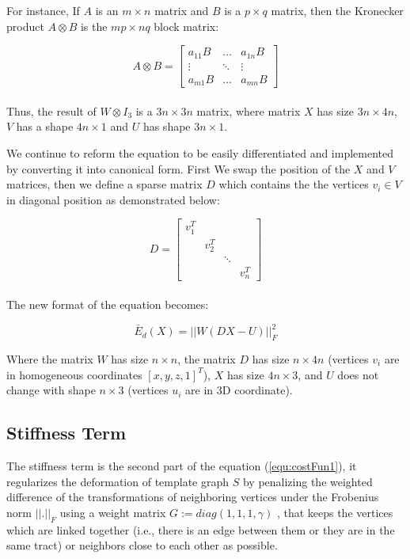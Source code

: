 \documentclass[../structure.tex]{subfiles}
\begin{document}
For instance, If $A$ is an $m \times n$ matrix and $B$ is a $p \times q$ matrix, then the Kronecker product $A \otimes B$ is the $mp \times nq$ block matrix:

\begin{equation*}
A \otimes B =
\begin{bmatrix}
a_{11}B & \dots  & a_{1n}B \\
\vdots  & \ddots & \vdots  \\
a_{m1}B & \dots  & a_{mn}B
\end{bmatrix}
\end{equation*}\\

Thus, the result of $W \otimes I_{3}$ is a $3n\times 3n$ matrix, where matrix $X$ has size $3n\times4n$, $V$ has a shape $4n\times1$ and $U$ has shape $3n\times1$.

We continue to reform the equation to be easily differentiated and implemented by converting it into canonical form. First We swap the position of the $X$ and $V$ matrices, then we define a sparse matrix $D$ which contains the the vertices $v_{i} \in V$ in diagonal position as demonstrated below:

\begin{equation}
D =
\begin{bmatrix}
v_{1}^T & & & \\
& v_{2}^T & & \\
& & \ddots & \\
& & & v_{n}^T
\end{bmatrix}
\label{equ:matD}
\end{equation}\\

The new format of the equation becomes:

\begin{equation}
\bar{E}_{d}(X) = ||W(DX-U)||_{F}^2
\label{equ:distance4}
\end{equation}

\hspace{2em}Where the matrix $W$ has size $n\times n$, the matrix $D$ has size $n\times 4n$ (vertices $v_{i}$ are in homogeneous coordinates $[x,y,z,1]^T$), $X$ has size $4n\times 3$, and $U$ does not change with shape $n\times 3$ (vertices $u_{i}$ are in 3D coordinate).

\subsection{Stiffness Term}
\hspace{2em}The stiffness term is the second part of the equation (\ref{equ:costFun1}), it regularizes the deformation of template graph $S$ by penalizing the weighted difference of the transformations of neighboring vertices under the Frobenius norm $||.||_{F}$ using a weight matrix $G := diag(1, 1, 1, \gamma)$ \cite{Amberg2007}, that keeps the vertices which are linked together (i.e., there is an edge between them or they are in the same tract) or neighbors close to each other as possible.
\end{document}
